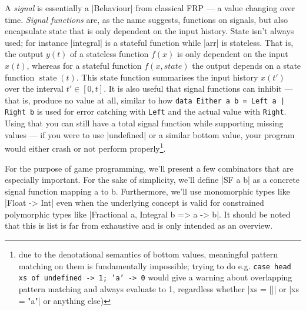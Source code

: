 \documentclass[pdftex,a4paper]{extarticle}
\begin{document}
A \emph{signal} is essentially a |Behaviour| from classical FRP --- a value changing over time.
\emph{Signal functions} are, as the name suggests, functions on signals, but also encapsulate state that is only dependent on the input history. State isn't always used; for instance |integral| is a stateful function while |arr| is stateless. That is, the output \(y(t)\) of a stateless function \(f(x)\) is only dependent on the input \(x(t)\), whereas for a stateful function $f(x, state)$ the output depends on a state function \(\operatorname{state}(t)\). This state function summarises the input history \(x(t')\) over the interval \(t' \in [0,t]\). It is also useful that signal functions can inhibit --- that is, produce no value at all, similar to how \texttt{data Either a b = Left a | Right b} is used for error catching with \texttt{Left} and the actual value with \texttt{Right}. Using that you can still have a total signal function while supporting missing values --- if you were to use |undefined| or a similar bottom value, your program would either crash or not perform properly\footnote{due to the denotational semantics of bottom values, meaningful pattern matching on them is fundamentally impossible; trying to do e.g. \texttt{case head xs of undefined -> 1; 'a' -> 0} would give a warning about overlapping pattern matching and always evaluate to 1, regardless whether |xs = []| or |xs = "a"| or anything else)}.

For the purpose of game programming, we'll present a few combinators that are especially important. For the sake of simplicity, we'll define |SF a b| as a concrete signal function mapping a to b. Furthermore, we'll use monomorphic types like |Float -> Int| even when the underlying concept is valid for constrained polymorphic types like |Fractional a, Integral b => a -> b|. It should be noted that this is list is far from exhaustive and is only intended as an overview.
\end{document}
